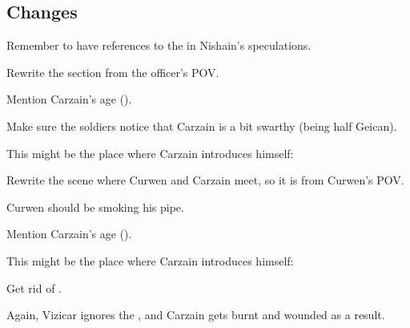 \subsection{Changes}
\begin{changes}
    
  \begin{comment}
  \paragraph{War is Coming}
  \end{comment}
    Remember to have references to the  in Nishain's speculations. 
    
    Rewrite the  section from the officer's POV. 
    
    Mention Carzain's age (). 
    
    Make sure the soldiers notice that Carzain is a bit swarthy (being half Geican). 
    
    This might be the place where Carzain introduces himself:

  \begin{comment}
  \paragraph{To \Malcur}
  \end{comment}
    Rewrite the scene where Curwen and Carzain meet, so it is from Curwen's POV. 
    
    Curwen should be smoking his pipe. 
    
    Mention Carzain's age (). 
    
    This might be the place where Carzain introduces himself:
  
  \begin{comment}\paragraph{\Forklin}\end{comment}
  \changesitem{\Forklin} 
    Get rid of \Racel. 
    
  \begin{comment}
  \paragraph{The \Caliph Inviolate}
  \end{comment}
    Again, Vizicar ignores the , and Carzain gets burnt and wounded as a result. 
    

\end{changes}
